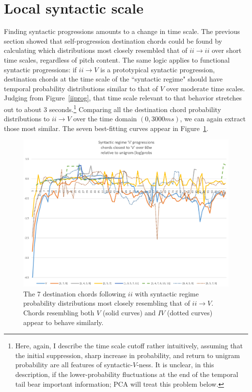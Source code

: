 \section{Local syntactic scale}
Finding syntactic progressions amounts to a change in time scale.  The previous section showed that self-progression destination chords could be found by calculating which distributions most closely resembled that of $ii\rightarrow ii$ over short time scales, regardless of pitch content.  The same logic applies to functional syntactic progressions: if $ii\rightarrow V$ is a prototypical syntactic progression, destination chords at the time scale of the ``syntactic regime" should have temporal probability distributions similar to that of $V$ over moderate time scales.  Judging from Figure~\ref{iiprog}, that time scale relevant to that behavior stretches out to about 3 seconds.\footnote{Here, again, I describe the time scale cutoff rather intuitively, assuming that the initial suppression, sharp increase in probability, and return to unigram probability are all features of syntactic-$V$-ness.  It is unclear, in this description, if the lower-probability fluctuations at the end of the temporal tail bear important information; PCA will treat this problem below.}  Comparing all the destination chord probability distributions to $ii \rightarrow V$ over the time domain $(0,3000ms)$, we can again extract those most similar.  The seven best-fitting curves appear in Figure~\ref{ii_syntactic}.

\begin{figure}
	\caption{The 7 destination chords following $ii$ with syntactic regime probability distributions most closely resembling that of $ii \rightarrow V$.  Chords resembling both $V$ (solid curves) and $IV$ (dotted curves) appear to behave similarly.}
	\label{ii_syntactic}
	\centering
	\includegraphics[width=6in]{ii_syntactic.png}
\end{figure}

